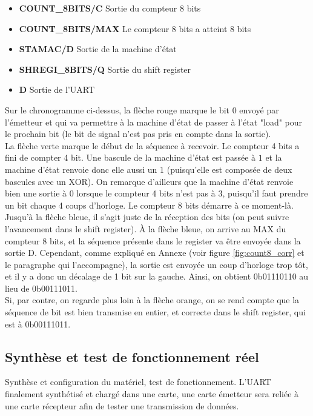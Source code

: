 \documentclass[a4paper]{article} %
\begin{document}
\begin{tcolorbox}[colframe=Monokaimagenta,colback=white]
\begin{itemize}
    \item     \textbf{COUNT\_8BITS/C} Sortie du compteur 8 bits
    \item     \textbf{COUNT\_8BITS/MAX} Le compteur 8 bits a atteint 8 bits
    \item     \textbf{STAMAC/D} Sortie de la machine d'état
    \item     \textbf{SHREGI\_8BITS/Q} Sortie du shift register
    \item     \textbf{D} Sortie de l'UART
\end{itemize}
Sur le chronogramme ci-dessus, la flèche rouge marque le bit $0$ envoyé par l'émetteur et qui va permettre à la machine d'état de passer à l'état "load" pour le prochain bit (le bit de signal n'est pas pris en compte dans la sortie).\\
La flèche verte marque le début de la séquence à recevoir. Le compteur 4 bits a fini de compter 4 bit. Une bascule de la machine d'état est passée à $1$ et la machine d'état renvoie donc elle aussi un $1$ (puisqu'elle est composée de deux bascules avec un XOR). On remarque d'ailleurs que la machine d'état renvoie bien une sortie à $0$ lorsque le compteur 4 bits n'est pas à 3, puisqu'il faut prendre un bit chaque 4 coups d'horloge. Le compteur 8 bits démarre à ce moment-là.\\
Jusqu'à la flèche bleue, il s'agit juste de la réception des bits (on peut suivre l'avancement dans le shift register). À la flèche bleue, on arrive au MAX du compteur 8 bits, et la séquence présente dans le register va être envoyée dans la sortie D. Cependant, comme expliqué en Annexe (voir figure \ref{fig:count8_corr} et le paragraphe qui l'accompagne), la sortie est envoyée un coup d'horloge trop tôt, et il y a donc un décalage de 1 bit sur la gauche. Ainsi, on obtient 0b01110110 au lieu de 0b00111011.\\
Si, par contre, on regarde plus loin à la flèche orange, on se rend compte que la séquence de bit est bien transmise en entier, et correcte dans le shift register, qui est à 0b00111011.\\
\end{tcolorbox}
 \subsection{Synthèse et test de fonctionnement réel}
Synthèse et configuration du matériel, test de fonctionnement.
L’UART finalement synthétisé et chargé dans une carte, une carte émetteur sera reliée à une carte récepteur afin de tester une transmission de données. 
\end{document}
